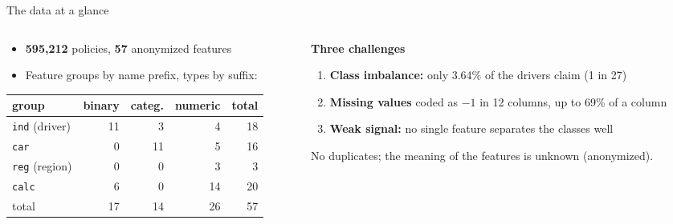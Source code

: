 \documentclass[aspectratio=169,11pt]{beamer}
\newcommand{\feat}[1]{\texttt{\small #1}}   %
\newcommand{\hl}[1]{\textcolor{accent}{\textbf{#1}}}
\begin{document}
\begin{frame}{The data at a glance}
  \begin{columns}[T]
    \begin{column}{0.5\textwidth}
      \begin{itemize}
        \item \hl{595,212} policies, \hl{57} anonymized features
        \item Feature groups by name prefix, types by suffix:
      \end{itemize}
      \medskip
      \centering\footnotesize
      \begin{tabular}{lrrrr}
        \toprule
        group & binary & categ. & numeric & total \\
        \midrule
        \feat{ind} (driver) & 11 & 3 & 4 & 18 \\
        \feat{car}          & 0 & 11 & 5 & 16 \\
        \feat{reg} (region) & 0 & 0 & 3 & 3 \\
        \feat{calc}         & 6 & 0 & 14 & 20 \\
        \midrule
        total & 17 & 14 & 26 & 57 \\
        \bottomrule
      \end{tabular}
    \end{column}
    \begin{column}{0.46\textwidth}
      \textbf{Three challenges}
      \begin{enumerate}
        \item \hl{Class imbalance:} only 3.64\% of the drivers claim (1 in 27)
        \item \hl{Missing values} coded as $-1$ in 12 columns, up to 69\% of a column
        \item \hl{Weak signal:} no single feature separates the classes well
      \end{enumerate}
      \medskip
      No duplicates; the meaning of the features is unknown (anonymized).
    \end{column}
  \end{columns}
\end{frame}
\end{document}
